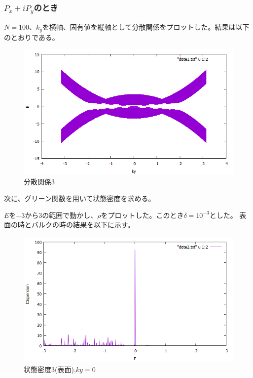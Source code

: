 \documentclass{jsarticle}
\begin{document}
            \subsubsection{$P_x+iP_y$のとき}
            $N=100$、$k_y$を横軸、固有値を縦軸として分散関係をプロットした。結果は以下のとおりである。
    
            \begin{figure}[H]
                \centering
                \includegraphics[scale=0.5]{BdG3_bry.png}
                \caption{分散関係3}
                \label{Dispersion3}
            \end{figure}
    
            次に、グリーン関数を用いて状態密度を求める。
           
            $E$を$-3$から$3$の範囲で動かし、$\rho$をプロットした。このとき$\delta=10^{-3}$とした。
            表面の時とバルクの時の結果を以下に示す。
    
            \begin{figure}[H]
                \centering
                \includegraphics[scale=0.5]{LDOS3_bry.png}
                \caption{状態密度3(表面),$ky=0$}
                \label{LDOS3}
            \end{figure}
\end{document}
